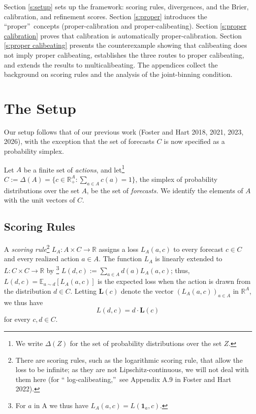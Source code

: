 \documentclass[12pt,a4paper,notitlepage]{article}
\begin{document}
Section \ref{s:setup} sets up the framework: scoring rules, divergences,
and the Brier, calibration, and refinement scores. Section \ref{s:proper}
introduces the \textquotedblleft proper\textquotedblright\ concepts
(proper-calibration and proper-calibeating). Section \ref{s:proper
calibration} proves that calibration is automatically proper-calibration.
Section \ref{s:proper calibeating} presents the counterexample showing that
calibeating does not imply proper calibeating, establishes the three routes
to proper calibeating, and extends the results to multicalibeating. The
appendices collect the background on scoring rules and the analysis of the
joint-binning condition.


\section{The Setup\label{s:setup}}

Our setup follows that of our previous work (Foster and Hart 2018, 2021,
2023, 2026), with the exception that the set of forecasts $C$ is now
specified as a probability simplex.

Let $A$ be a finite set of \emph{actions}, and let\footnote{%
We write $\Delta (Z)$ for the set of probability distributions over the set $%
Z$.} $C:=\Delta (A)=\{c\in \mathbb{R}_{+}^{A}:\sum_{a\in A}c(a)=1\}$, the
simplex of probability distributions over the set $A$, be the set of \emph{%
forecasts.} We identify the elements of $A$ with the unit vectors of $C$.

\subsection{Scoring Rules\label{sus:scoring rules}}

A \emph{scoring rule}\footnote{%
There are scoring rules, such as the logarithmic scoring rule, that allow
the loss to be infinite; as they are not Lipschitz-continuous, we will not
deal with them here (for \textquotedblleft
log-calibeating,\textquotedblright\ see Appendix A.9 in Foster and Hart
2022).} $L_{A}:A\times C\rightarrow \mathbb{R}$ assigns a loss $L_{A}(a,c)$
to every forecast $c\in C$ and every realized action $a\in A$. The function $%
L_{A}$ is linearly extended to $L:C\times C\rightarrow \mathbb{R}$ by%
\footnote{%
For $a$ in A we thus have $L_{A}(a,c)=L(\mathbf{1}_{a},c).$} $%
L(d,c):=\sum_{a\in A}d(a)L_{A}(a,c)$; thus, $L(d,c)=\mathbb{E}_{a\sim d}%
\left[ L_{A}(a,c)\right] $ is the expected loss when the action is drawn
from the distribution $d\in C.$ Letting $\mathbf{L}(c)$ denote the vector $%
(L_{A}(a,c))_{a\in A}$ in $\mathbb{R}^{A}$, we thus have%
\begin{equation}
L(d,c)=d\cdot \mathbf{L}(c)  \label{eq:d*Lambda(c)}
\end{equation}%
for every $c,d\in C.$
\end{document}
